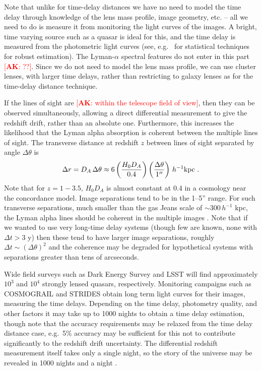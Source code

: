 \documentclass[preprint2, 10pt]{aastex}
\newcommand{\be}{\begin{equation}}
\newcommand{\ee}{\end{equation}}
\newcommand{\alex}[1]{\textcolor{red}{[{\bf AK}: #1]}}
\begin{document}
Note that unlike for time-delay distances 
we have no need to model the time delay through knowledge of the lens mass 
profile, image geometry, etc. -- all we need to do is measure it from 
monitoring the light curves of the images.  A bright, time varying source 
such as a quasar is ideal for this, and the time delay is measured from 
the photometric light curves (see, e.g.\ \citet{tewes,hkl} for statistical 
techniques for 
robust estimation).  The Lyman-$\alpha$ spectral features do not enter in 
this part \alex{??}.  Since we do not need to model the lens mass profile, we can 
use cluster lenses, with larger time delays, rather than restricting to 
galaxy lenses as for the time-delay distance technique. 

If the lines of sight are \alex{within the telescope field of view}, then they can be 
observed simultaneously, allowing a direct differential measurement to give 
the redshift drift, rather than an absolute one.  Furthermore, this increases 
the likelihood that the Lyman alpha absorption is coherent between the 
multiple lines of sight.  The transverse distance at redshift $z$ between 
lines of sight separated by angle $\Delta\theta$ is 
\be 
\Delta r=D_A\,\Delta\theta\approx 
6\left(\frac{H_0D_A}{0.4}\right)\left(\frac{\Delta\theta}{1''}\right)\, 
h^{-1}{\rm kpc} \ . 
\ee 
Note that for $z=1-3.5$, $H_0D_A$ is almost constant at 0.4 in a 
cosmology near the concordance model.  Image separations tend to be in 
the 1--5'' range.  For such transverse separations, much smaller than 
the gas Jeans scale of $\sim300\,h^{-1}$ kpc, the Lyman alpha lines 
should be coherent in the multiple images \citep{09100250}.  
Note that if we wanted to 
use very long-time delay systems (though few are known, none with 
$\Delta t>3$ y) then these tend to have larger image separations, roughly 
$\Delta t\sim(\Delta\theta)^2$ and the coherence may be degraded for 
hypothetical systems with separations greater than tens of arcseconds. 

Wide field surveys such as Dark Energy Survey and LSST will find 
approximately $10^3$ and $10^4$ strongly lensed quasars, respectively.  
Monitoring 
campaigns such as COSMOGRAIL \citep{cosmograil} and STRIDES \citep{strides} 
obtain long term light curves for their images, measuring the time 
delays.  Depending on the time delay, photometry quality, and other 
factors it may take up to 1000 nights to obtain a time delay 
estimation, though note that the accuracy requirements may be relaxed 
from the time delay distance case, e.g.\ 5\% accuracy may be sufficient 
for this not to contribute significantly to the redshift drift uncertainty. 
The differential redshift measurement itself takes only a single night, 
so the story of the universe may be revealed in 1000 nights and a night 
\citep{1001}. 
\end{document}
